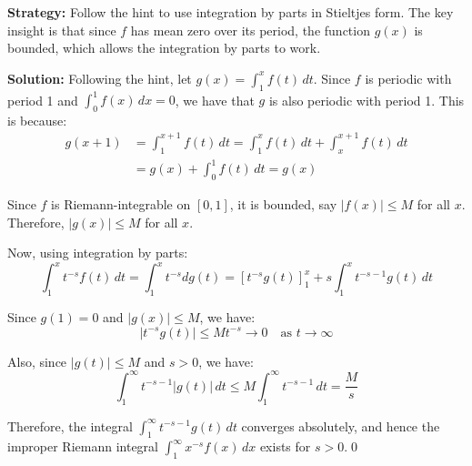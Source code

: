 \noindent\textbf{Strategy:} Follow the hint to use integration by parts in Stieltjes form. The key insight is that since $f$ has mean zero over its period, the function $g(x)$ is bounded, which allows the integration by parts to work.

\bigskip\noindent\textbf{Solution:}
Following the hint, let $g(x) = \int_{1}^{x} f(t) \, dt$. Since $f$ is periodic with period 1 and $\int_{0}^{1} f(x) \, dx = 0$, we have that $g$ is also periodic with period 1. This is because:
\begin{align*}
g(x+1) &= \int_{1}^{x+1} f(t) \, dt = \int_{1}^{x} f(t) \, dt + \int_{x}^{x+1} f(t) \, dt \\
&= g(x) + \int_{0}^{1} f(t) \, dt = g(x)
\end{align*}

Since $f$ is Riemann-integrable on $[0, 1]$, it is bounded, say $|f(x)| \leq M$ for all $x$. Therefore, $|g(x)| \leq M$ for all $x$.

Now, using integration by parts:
\[\int_{1}^{x} t^{-s} f(t) \, dt = \int_{1}^{x} t^{-s} dg(t) = \left[t^{-s} g(t)\right]_{1}^{x} + s \int_{1}^{x} t^{-s-1} g(t) \, dt\]

Since $g(1) = 0$ and $|g(x)| \leq M$, we have:
\[\left|t^{-s} g(t)\right| \leq M t^{-s} \to 0 \quad \text{as } t \to \infty\]

Also, since $|g(t)| \leq M$ and $s > 0$, we have:
\[\int_{1}^{\infty} t^{-s-1} |g(t)| \, dt \leq M \int_{1}^{\infty} t^{-s-1} \, dt = \frac{M}{s}\]

Therefore, the integral $\int_{1}^{\infty} t^{-s-1} g(t) \, dt$ converges absolutely, and hence the improper Riemann integral $\int_{1}^{\infty} x^{-s} f(x) \, dx$ exists for $s > 0$.\qed


